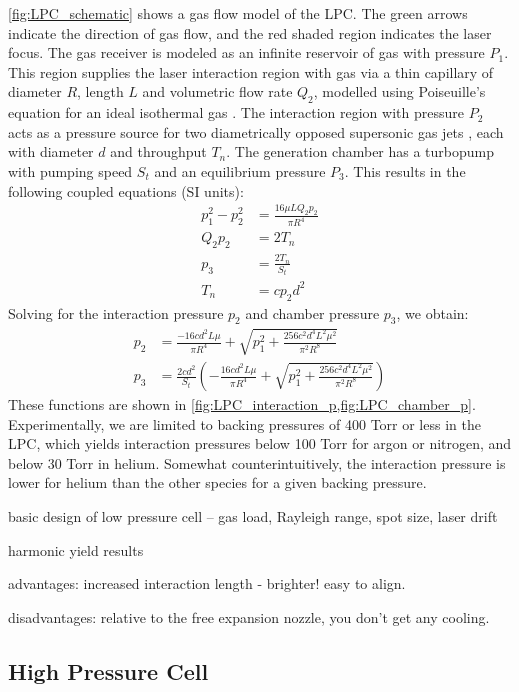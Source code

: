 \cref{fig:LPC_schematic} shows a gas flow model of the LPC. The green arrows indicate the direction of gas flow, and the red shaded region indicates the laser focus. The gas receiver is modeled as an infinite reservoir of gas with pressure $P_1$. This region supplies the laser interaction region with gas via a thin capillary of diameter $R$, length $L$ and volumetric flow rate $Q_2$, modelled using Poiseuille's equation for an ideal isothermal gas \cite{fryerTheoryGasFlow1966,venerusLaminarCapillaryFlow2006}. The interaction region with pressure $P_2$ acts as a pressure source for two diametrically opposed supersonic gas jets \cite{millerFreeJetSources1988}, each with diameter $d$ and throughput $T_{n}$. The generation chamber has a turbopump with pumping speed $S_{t}$ and an equilibrium pressure $P_3$. This results in the following coupled equations (SI units):
\begin{align}
p_1^2 - p_2^2 &= \frac{16 \mu L Q_2 p_2}{\pi R^4} \\
Q_2 p_2 &= 2 T_n \\
p_3 &= \frac{2 T_n}{S_t} \\
T_n &= c p_2 d^2
\label{eqn:LPC_coupled_equations}
\end{align}
Solving for the interaction pressure $p_2$ and chamber pressure $p_3$, we obtain:
\begin{align}
p_2 &= \frac{-16 c d^2 L \mu}{\pi R^4} + \sqrt{p_1^2 + \frac{256 c^2 d^4 L^2 \mu^2}{\pi^2 R^8}} \\
p_3 &= \frac{2 c d^2}{S_t} \left( - \frac{16 c d^2 L \mu}{\pi R^4} + \sqrt{p_1^2 + \frac{256 c^2 d^4 L^2 \mu^2}{\pi^2 R^8}}  \right)
\label{eqn:LPC_pressures}
\end{align}
These functions are shown in \cref{fig:LPC_interaction_p,fig:LPC_chamber_p}. Experimentally, we are limited to backing pressures of 400 Torr or less in the LPC, which yields interaction pressures below 100 Torr for argon or nitrogen, and below 30 Torr in helium. Somewhat counterintuitively, the interaction pressure is lower for helium than the other species for a given backing pressure.


basic design of low pressure cell -- gas load, Rayleigh range, spot size, laser drift


harmonic yield results

advantages: increased interaction length - brighter! easy to align.

disadvantages: relative to the free expansion nozzle, you don't get any cooling.

\subsection{High Pressure Cell}
\label{sec:HPC}

